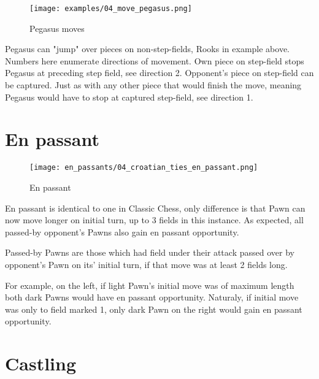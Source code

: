 \noindent
\begin{figure}[!h]
\vspace{-1.2\baselineskip}
\texttt{[image: examples/04\_move\_pegasus.png]}
\caption{Pegasus moves}
\label{fig:04_move_pegasus}
\end{figure}

Pegasus can "jump" over pieces on non-step-fields, Rooks in example above. Numbers
here enumerate directions of movement. Own piece on step-field stops Pegasus at
preceding step field, see direction 2. Opponent's piece on step-field can be captured.
Just as with any other piece that would finish the move, meaning Pegasus would have to
stop at captured step-field, see direction 1.

\clearpage %

\section*{En passant}

\noindent
\begin{wrapfigure}[17]{l}{0.3\textwidth}
\texttt{[image: en\_passants/04\_croatian\_ties\_en\_passant.png]}
\caption{En passant}
\label{fig:04_croatian_ties_en_passant}
\end{wrapfigure}
En passant is identical to one in Classic Chess, only difference is that Pawn can now
move longer on initial turn, up to 3 fields in this instance. As expected, all passed-by
opponent's Pawns also gain en passant opportunity.

Passed-by Pawns are those which had field under their attack passed over by opponent's Pawn
on its' initial turn, if that move was at least 2 fields long.

For example, on the left, if light Pawn's initial move was of maximum length both dark Pawns
would have en passant opportunity. Naturaly, if initial move was only to field marked 1, only
dark Pawn on the right would gain en passant opportunity.

\clearpage %

\section*{Castling}

